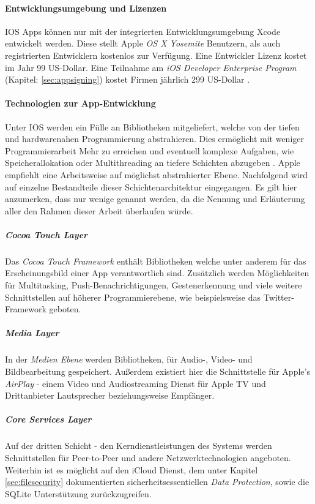 		\paragraph{Entwicklungsumgebung und Lizenzen}
			IOS Apps können nur mit der integrierten Entwicklungsumgebung Xcode
			entwickelt werden. Diese stellt Apple \textsl{OS X Yosemite}
			Benutzern, als auch registrierten Entwicklern kostenlos zur Verfügung.
			Eine Entwickler Lizenz kostet im Jahr 99 US-Dollar. Eine Teilnahme am
			\textsl{iOS Developer Enterprise Program} (Kapitel: \ref{sec:appsigning})
			kostet Firmen jährlich 299 US-Dollar \cite{AppleDev2015}.
		\paragraph{Technologien zur App-Entwicklung}
			Unter IOS werden ein Fülle an Bibliotheken mitgeliefert, welche von der
			tiefen und hardwarenahen Programmierung abstrahieren. Dies ermöglicht mit weniger
			Programmierarbeit Mehr zu erreichen und eventuell komplexe Aufgaben, wie
			Speicherallokation oder Multithreading an tiefere Schichten abzugeben
			\cite{AboutiOSTech2015}.
			Apple empfiehlt eine Arbeitsweise auf möglichst abstrahierter Ebene.
			Nachfolgend wird auf einzelne Bestandteile dieser Schichtenarchitektur
			eingegangen. Es gilt hier anzumerken, dass nur wenige genannt werden, da die
			Nennung und Erläuterung aller den Rahmen dieser Arbeit überlaufen würde.
			\subparagraph{Cocoa Touch Layer}
				Das \textsl{Cocoa Touch Framework} enthält Bibliotheken welche unter anderem
				für das Erscheinungsbild einer App verantwortlich sind. Zusätzlich werden
				Möglichkeiten für Multitasking, Push-Benachrichtigungen, Gestenerkennung und
				viele weitere Schnittstellen auf höherer Programmierebene, wie beispielsweise
				das Twitter-Framework geboten.
			\subparagraph{Media Layer}
				In der \textsl{Medien Ebene} werden Bibliotheken, für
				Audio-, Video- und Bildbearbeitung gespeichert. Außerdem existiert hier die
				Schnittstelle für Apple's \textsl{AirPlay} - einem Video und Audiostreaming
				Dienst für Apple TV und Drittanbieter Lautsprecher beziehungsweise Empfänger.
			\subparagraph{Core Services Layer}
				Auf der dritten Schicht - den Kerndienstleistungen des Systems werden
				Schnittstellen für Peer-to-Peer und andere Netzwerktechnologien angeboten.
				Weiterhin ist es möglicht auf den iCloud Dienst, dem unter Kapitel
				\ref{sec:filesecurity} dokumentierten sicherheitsessentiellen \textsl{Data
				Protection}, sowie die SQLite Unterstützung zurückzugreifen.

